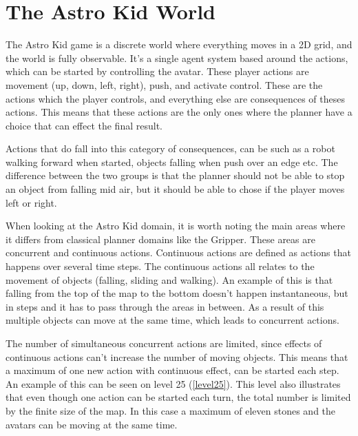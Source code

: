 	\chapter{The Astro Kid World}
	The Astro Kid game is a discrete world where everything moves in a 2D grid, and the world is fully observable. It's a single agent system based around the actions, which can be started by controlling the avatar. These player actions are movement (up, down, left, right), push, and activate control. These are the actions which the player controls, and everything else are consequences of theses actions. This means that these actions are the only ones where the planner have a choice that can effect the final result. 
	
	
	Actions that do fall into this category of consequences, can be such as a robot walking forward when started, objects falling when push over an edge etc. The difference between the two groups is that the planner should not be able to stop an object from falling mid air, but it should be able to chose if the player moves left or right. 
	

	When looking at the Astro Kid domain, it is worth noting the main areas where it differs from classical planner domains like the Gripper. These areas are concurrent and continuous actions. Continuous actions are defined as actions that happens over several time steps. The continuous actions all relates to the movement of objects (falling, sliding and walking). An example of this is that falling from the top of the map to the bottom doesn't happen instantaneous, but in steps and it has to pass through the areas in between. As a result of this multiple objects can move at the same time, which leads to concurrent actions.
	
	The number of simultaneous concurrent actions are limited, since effects of continuous actions can't increase the number of moving objects. This means that a maximum of one new action with continuous effect, can be started each step. An example of this can be seen on level 25 (\ref{level25}). This level also illustrates that even though one action can be started each turn, the total number is limited by the finite size of the map. In this case a maximum of eleven stones and the avatars can be moving at the same time.

